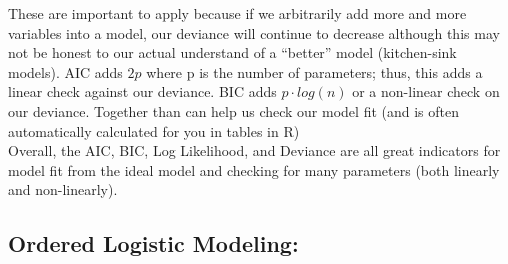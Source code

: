 \documentclass[12pt]{article}\usepackage[]{graphicx}\usepackage[]{color}
\begin{document}
\begin{flushleft}
These are important to apply because if we arbitrarily add more and more variables into a model, our deviance will continue to decrease although this may not be honest to our actual understand of a ``better'' model (kitchen-sink models). AIC adds $2p$ where p is the number of parameters; thus, this adds a linear check against our deviance. BIC adds $p\cdot log(n)$ or a non-linear check on our deviance. Together than can help us check our model fit (and is often automatically calculated for you in tables in R) \\

Overall, the AIC, BIC, Log Likelihood, and Deviance are all great indicators for model fit from the ideal model and checking for many parameters (both linearly and non-linearly).

















\clearpage
\subsection{Ordered Logistic Modeling:}


\end{flushleft}
\end{document}
